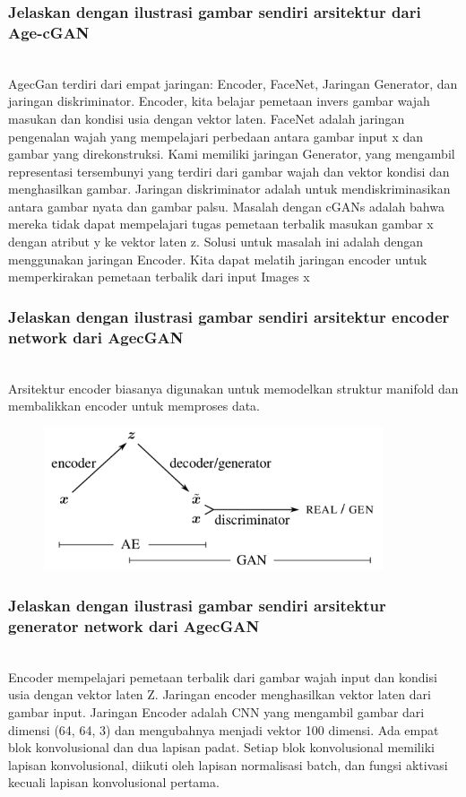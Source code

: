 	\subsubsection{Jelaskan dengan ilustrasi gambar sendiri arsitektur dari Age-cGAN}
	\hfill\\
	AgecGan terdiri dari empat jaringan: Encoder, FaceNet, Jaringan Generator, dan jaringan diskriminator. 
	Encoder, kita belajar pemetaan invers gambar wajah masukan dan kondisi usia dengan vektor laten. 
	FaceNet adalah jaringan pengenalan wajah yang mempelajari perbedaan antara gambar input x dan gambar yang direkonstruksi. 
	Kami memiliki jaringan Generator, yang mengambil representasi tersembunyi yang terdiri dari gambar wajah dan vektor kondisi dan menghasilkan gambar. 
	Jaringan diskriminator adalah untuk mendiskriminasikan antara gambar nyata dan gambar palsu. 
	Masalah dengan cGANs adalah bahwa mereka tidak dapat mempelajari tugas pemetaan terbalik masukan gambar x dengan atribut y ke vektor laten z. 
	Solusi untuk masalah ini adalah dengan menggunakan jaringan Encoder. 
	Kita dapat melatih jaringan encoder untuk memperkirakan pemetaan terbalik dari input Images x	
	
	\subsubsection{Jelaskan dengan ilustrasi gambar sendiri arsitektur encoder network dari AgecGAN}
	\hfill\\
	Arsitektur encoder biasanya digunakan untuk memodelkan struktur manifold dan membalikkan encoder untuk memproses data.

	\begin{figure}[H]
		\begin{center}
		 \includegraphics[width=10cm]{figures/1174076/figures9/teori3.png}
		 \caption{}	
		\end{center}
	\end{figure}
	
	\subsubsection{Jelaskan dengan ilustrasi gambar sendiri arsitektur generator network dari AgecGAN}
	\hfill\\
	Encoder mempelajari pemetaan terbalik dari gambar wajah input dan kondisi usia dengan vektor laten Z. Jaringan encoder menghasilkan vektor laten dari gambar input. Jaringan Encoder adalah CNN yang mengambil gambar dari dimensi (64, 64, 3) dan mengubahnya menjadi vektor 100 dimensi. Ada empat blok konvolusional dan dua lapisan padat. Setiap blok konvolusional memiliki lapisan konvolusional, diikuti oleh lapisan normalisasi batch, dan fungsi aktivasi kecuali lapisan konvolusional pertama.
	
